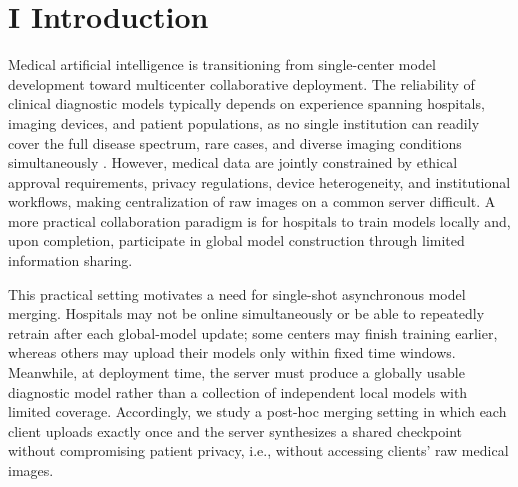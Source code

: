 \documentclass[letterpaper]{article} %
\begin{document}
\section{I Introduction}

Medical artificial intelligence is transitioning from single-center model development toward multicenter collaborative deployment. The reliability of clinical diagnostic models typically depends on experience spanning hospitals, imaging devices, and patient populations, as no single institution can readily cover the full disease spectrum, rare cases, and diverse imaging conditions simultaneously \cite{sheller2020federated,rieke2020future}. However, medical data are jointly constrained by ethical approval requirements, privacy regulations, device heterogeneity, and institutional workflows, making centralization of raw images on a common server difficult\cite{kaissis2020secure}. A more practical collaboration paradigm is for hospitals to train models locally and, upon completion, participate in global model construction through limited information sharing.

This practical setting motivates a need for single-shot asynchronous model merging. Hospitals may not be online simultaneously or be able to repeatedly retrain after each global-model update; some centers may finish training earlier, whereas others may upload their models only within fixed time windows. Meanwhile, at deployment time, the server must produce a globally usable diagnostic model rather than a collection of independent local models with limited coverage. Accordingly, we study a post-hoc merging setting in which each client uploads exactly once and the server synthesizes a shared checkpoint without compromising patient privacy, i.e., without accessing clients’ raw medical images.
\end{document}
